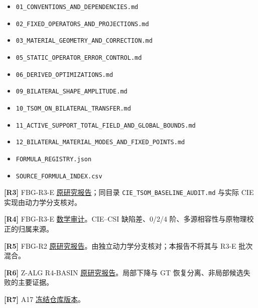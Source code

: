 \documentclass[11pt,a4paper]{article}
\newcommand{\tightlist}{\setlength{\itemsep}{0pt}\setlength{\parskip}{0pt}}
\begin{document}
\begin{itemize}
\tightlist
\item
  \texttt{01\_CONVENTIONS\_AND\_DEPENDENCIES.md}
\item
  \texttt{02\_FIXED\_OPERATORS\_AND\_PROJECTIONS.md}
\item
  \texttt{03\_MATERIAL\_GEOMETRY\_AND\_CORRECTION.md}
\item
  \texttt{05\_STATIC\_OPERATOR\_ERROR\_CONTROL.md}
\item
  \texttt{06\_DERIVED\_OPTIMIZATIONS.md}
\item
  \texttt{09\_BILATERAL\_SHAPE\_AMPLITUDE.md}
\item
  \texttt{10\_TSOM\_ON\_BILATERAL\_TRANSFER.md}
\item
  \texttt{11\_ACTIVE\_SUPPORT\_TOTAL\_FIELD\_AND\_GLOBAL\_BOUNDS.md}
\item
  \texttt{12\_BILATERAL\_MATERIAL\_MODES\_AND\_FIXED\_POINTS.md}
\item
  \texttt{FORMULA\_REGISTRY.json}
\item
  \texttt{SOURCE\_FORMULA\_INDEX.csv}
\end{itemize}

\textbf{{[}R3{]}} FBG-R3-E
\href{https://github.com/migodam/b1-probabilistic-maxwell-imaging/blob/7317601b43b914525c21f09e5a60020552ea677b/research/research_fbg_r3_experiments/RESEARCH_REPORT_ZH.md}{原研究报告}；同目录
\texttt{CIE\_TSOM\_BASELINE\_AUDIT.md} 与实际 CIE 实现由动力学分支核对。

\textbf{{[}R4{]}} FBG-R3-E
\href{https://github.com/migodam/b1-probabilistic-maxwell-imaging/blob/7317601b43b914525c21f09e5a60020552ea677b/research/research_fbg_r3_experiments/MATHEMATICAL_AUDIT.md}{数学审计}。CIE--CSI
缺陷差、0/2/4 阶、多源相容性与原物理校正的归属来源。

\textbf{{[}R5{]}} FBG-R2
\href{https://github.com/migodam/b1-probabilistic-maxwell-imaging/blob/7317601b43b914525c21f09e5a60020552ea677b/research/research_fbg_r2_adaptive_feedback/RESEARCH_REPORT_ZH.md}{原研究报告}。由独立动力学分支核对；本报告不将其与
R3-E 批次混合。

\textbf{{[}R6{]}} Z-ALG R4-BASIN
\href{https://github.com/migodam/b1-probabilistic-maxwell-imaging/blob/7317601b43b914525c21f09e5a60020552ea677b/research/research_z_alg_r4_basin/RESEARCH_REPORT_ZH.md}{原研究报告}。局部下降与
GT 恢复分离、非局部候选失败的主要证据。

\textbf{{[}R7{]}} A17
\href{https://github.com/migodam/a17-maxwell-certified-exchange/tree/2ac81b989a2f13d62df9d5a7abd690a33c2189c7}{冻结仓库版本}。
\end{document}
